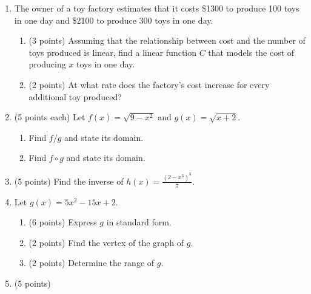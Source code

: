 \documentclass[12pt]{article}
\begin{document}
\begin{enumerate}

\item The owner of a toy factory estimates that it costs \$1300 to produce 100 toys in one day and \$2100 to produce 300 toys in one day.
\begin{enumerate}
\item (3 points) Assuming that the relationship between cost and the number of toys produced is linear, find a linear function $C$ that models the cost of producing $x$ toys in one day.\\
\vspace{.7in}
\item (2 points) At what rate does the factory's cost increase for every additional toy produced?
\vspace{.3in}
\end{enumerate}
\item (5 points each) Let $f(x)=\sqrt{9-x^2}$ and $g(x)=\sqrt{x+2}.$
\begin{enumerate}
\item Find $f/g$ and state its domain.
\vfill
\item Find $f\circ g$ and state its domain.
\vfill
\end{enumerate}
\newpage
\item (5 points) Find the inverse of $h(x)=\frac{(2-x^3)^5}{7}.$
\vfill
\item Let $g(x)=5x^2-15x +2.$
\begin{enumerate}
\item (6 points) Express $g$ in standard form.
\vfill
\item (2 points) Find the vertex of the graph of $g.$
\vspace{.5in}
\item (2 points) Determine the range of $g.$
\vspace{.5in}
\end{enumerate}
\item (5 points)\\

\end{enumerate}
\end{document}
